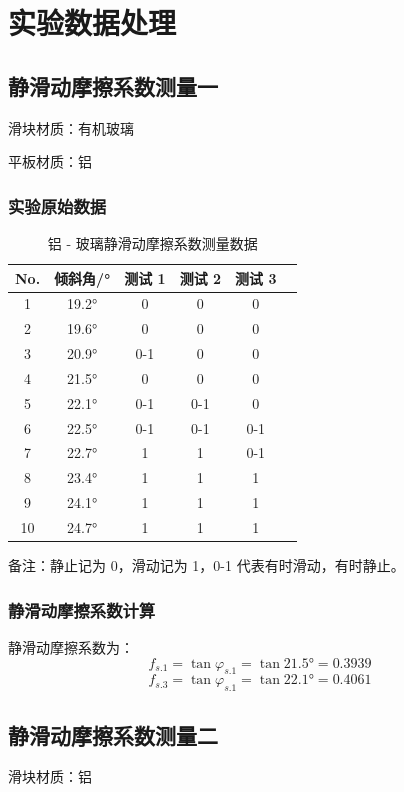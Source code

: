 \section{实验数据处理}
\subsection{静滑动摩擦系数测量一}
滑块材质：有机玻璃

平板材质：铝
\subsubsection{实验原始数据}

\begin{table}[h!]
    \centering
    \renewcommand{\arraystretch}{1.5}
    \setlength{\tabcolsep}{8pt}
    \begin{tabular}{|c|c|c|c|c|c|}
    \hline
    \textbf{No.} & \textbf{倾斜角/°} & 测试 1 & 测试 2 & 测试 3 \\ \hline
    1 & 19.2° & 0 & 0 & 0 \\ \hline
    2 & 19.6° & 0 & 0 & 0 \\ \hline
    3 & 20.9° & 0-1 & 0 & 0 \\ \hline
    4 & 21.5° & 0 & 0 & 0 \\ \hline
    5 & 22.1° & 0-1 & 0-1 & 0 \\ \hline
    6 & 22.5° & 0-1 & 0-1 & 0-1\\ \hline
    7 & 22.7° & 1 & 1 & 0-1 \\ \hline
    8 & 23.4° & 1 & 1 & 1 \\ \hline
    9 & 24.1° & 1 & 1 & 1 \\ \hline
    10 & 24.7° & 1 &1 & 1 \\ \hline
    \end{tabular}
    \caption{铝 - 玻璃静滑动摩擦系数测量数据}
    \label{tab:static_friction_data}
\end{table}
备注：静止记为 0，滑动记为 1，0-1 代表有时滑动，有时静止。
\subsubsection{静滑动摩擦系数计算}
静滑动摩擦系数为：
$$  
f_{s.1}=\tan \varphi_{s.1}=\tan 21.5°=0.3939
$$ 
$$ 
f_{s.3}=\tan \varphi_{s.1}=\tan 22.1°=0.4061
$$
\subsection{静滑动摩擦系数测量二}
滑块材质：铝

